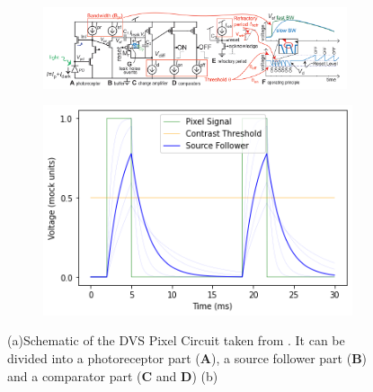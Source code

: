 
\begin{figure}
  \begin{subfigure}{0.5\textwidth}
    \includegraphics[height=2.4cm]{chapters/papers/ED/resources/images/intensity-estimation/DVSCircuit.png}
    \caption{}
    \label{fig:image1}
  \end{subfigure}
  \begin{subfigure}{0.5\textwidth}
    \centering
    \includegraphics[width=0.7\linewidth]{chapters/papers/ED/resources/plots/intensity-estimation/source_follower.png}
    \caption{}
    \label{fig:image2}
  \end{subfigure}
  \caption{(a)Schematic of the DVS Pixel Circuit taken from \cite{DVSBiases2023}. It can be divided into a photoreceptor part (\textbf{A}), a source follower part (\textbf{B}) and a comparator part (\textbf{C} and \textbf{D})
  (b) }
  \label{fig:whole_figure}
\end{figure}